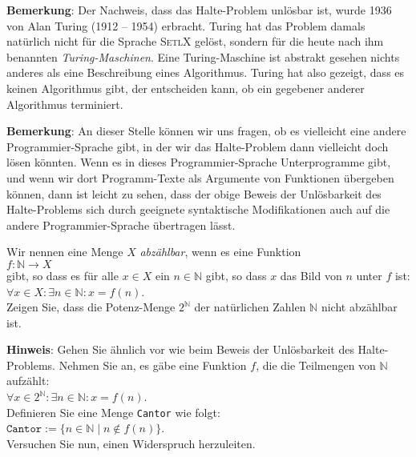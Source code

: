 \noindent
\textbf{Bemerkung}:
Der Nachweis, dass das Halte-Problem unl\"osbar ist, wurde 1936 von Alan Turing (1912 -- 1954)
\cite{turing:36} erbracht.  Turing hat das Problem damals nat\"urlich nicht f\"ur die Sprache
\textsc{SetlX} gel\"ost, sondern f\"ur die heute nach ihm benannten \emph{Turing-Maschinen}.  
Eine Turing-Maschine ist abstrakt gesehen nichts anderes als eine Beschreibung eines
Algorithmus.  Turing hat also gezeigt, dass es keinen Algorithmus gibt, der entscheiden
kann, ob ein gegebener anderer Algorithmus terminiert.
\vspace*{0.3cm}

\noindent
\textbf{Bemerkung}:
An dieser Stelle k\"onnen wir uns fragen, ob es vielleicht eine andere Programmier-Sprache
gibt, in der wir das Halte-Problem dann vielleicht doch l\"osen k\"onnten.  
Wenn es in dieses Programmier-Sprache Unterprogramme gibt, und wenn wir dort
Programm-Texte als Argumente von Funktionen \"ubergeben k\"onnen, dann ist leicht zu sehen,
dass der obige Beweis der 
Unl\"osbarkeit des Halte-Problems sich durch geeignete syntaktische Modifikationen auch auf
die andere Programmier-Sprache \"ubertragen l\"asst.
\pagebreak

\exercise
Wir nennen eine Menge $X$ \emph{abz\"ahlbar}, wenn  es eine Funktion \\[0.1cm]
\hspace*{1.3cm} $f: \mathbb{N} \rightarrow X$ \\[0.1cm]
gibt, so dass es f\"ur alle $x\in X$ ein $n \in \mathbb{N}$ gibt, so dass $x$ das Bild von
$n$ unter $f$ ist: \\[0.1cm]
\hspace*{1.3cm} $\forall x \in X: \exists n \in \mathbb{N}: x = f(n)$.
\\[0.1cm]
Zeigen Sie, dass die Potenz-Menge $2^\mathbb{N}$ der nat\"urlichen Zahlen $\mathbb{N}$ 
nicht abz\"ahlbar ist.  
\vspace*{0.2cm}

\noindent
\textbf{Hinweis}: Gehen Sie \"ahnlich vor wie beim Beweis der Unl\"osbarkeit des
Halte-Problems.  Nehmen Sie an, es g\"abe eine Funktion $f$, die die Teilmengen von
$\mathbb{N}$ aufz\"ahlt: \\[0.1cm]
\hspace*{1.3cm}  $\forall x \in 2^\mathbb{N}: \exists n \in \mathbb{N}: x = f(n)$.
\\[0.1cm]
Definieren Sie eine Menge \texttt{Cantor} wie folgt:
\\[0.1cm]
\hspace*{1.3cm} $\mathtt{Cantor} := \bigl\{ n \in \mathbb{N} \mid n \notin f(n) \bigr\}$.
\\[0.1cm]
Versuchen Sie nun, einen Widerspruch herzuleiten.


